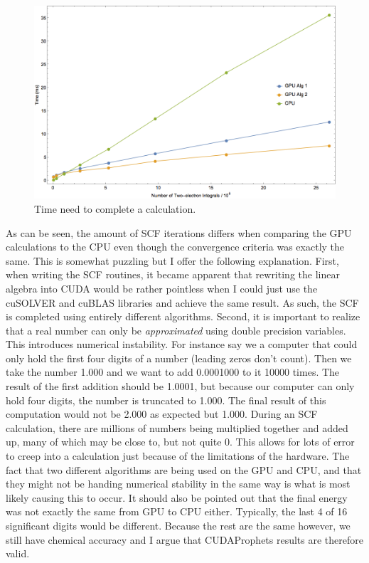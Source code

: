 \documentclass[12pt]{report}
\begin{document}
\begin{figure}[h!]
\includegraphics[width=1\textwidth]{Figures/totaltimeprof.png}
\caption[Total Time need to complete a calculation.]
{Time need to complete a calculation.}
\label{fig:totaltimeprof}
\end{figure}

As can be seen, the amount of SCF iterations differs when comparing the GPU calculations to the CPU even though the convergence criteria was exactly the same. This is somewhat puzzling but I offer the following explanation. First, when writing the SCF routines, it became apparent that rewriting the linear algebra into CUDA would be rather pointless when I could just use the cuSOLVER and cuBLAS libraries and achieve the same result. As such, the SCF is completed using entirely different algorithms. Second, it is important to realize that a real number can only be \textit{approximated} using double precision variables. This introduces numerical instability. For instance say we a computer that could only hold the first four digits of a number (leading zeros don't count). Then we take the number 1.000 and we want to add 0.0001000 to it 10000 times. The result of the first addition should be 1.0001, but because our computer can only hold four digits, the number is truncated to 1.000. The final result of this computation would not be 2.000 as expected but 1.000. During an SCF calculation, there are millions of numbers being multiplied together and added up, many of which may be close to, but not quite 0. This allows for lots of error to creep into a calculation just because of the limitations of the hardware. The fact that two different algorithms are being used on the GPU and CPU, and that they might not be handing numerical stability in the same way is what is most likely causing this to occur. It should also be pointed out that the final energy was not exactly the same from GPU to CPU either. Typically, the last 4 of 16 significant digits would be different. Because the rest are the same however, we still have chemical accuracy and I argue that CUDAProphets results are therefore valid.
\end{document}
